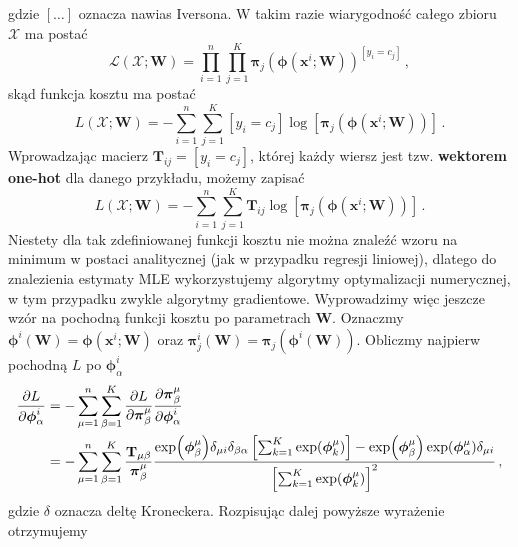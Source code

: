 \documentclass{myclass}
\numberwithin{equation}{subsection}
\begin{document}
gdzie \([\ldots]\) oznacza nawias Iversona. W takim razie wiarygodność całego zbioru \(\mathcal{X}\)
ma postać
\begin{equation}
    \mathcal{L}(\mathcal{X}; \mathbf{W}) = \prod_{i=1}^n \prod_{j=1}^K \boldsymbol{\pi}_j\left(\boldsymbol{\phi}(\mathbf{x}^i; \mathbf{W})\right)^{[y_i = c_j]}\,,
\end{equation}
skąd funkcja kosztu ma postać
\begin{equation}
    L(\mathcal{X}; \mathbf{W}) = - \sum_{i=1}^n \sum_{j=1}^K [y_i = c_j] \log \left[ \boldsymbol{\pi}_j\left(\boldsymbol{\phi}(\mathbf{x}^i; \mathbf{W})\right)\right]\,.
\end{equation}
Wprowadzając macierz \(\mathbf{T}_{ij} = [y_i = c_j]\), której każdy wiersz jest tzw.
\textbf{wektorem one-hot} dla danego przykładu, możemy zapisać
\begin{equation}\boxed{
    L(\mathcal{X}; \mathbf{W}) = - \sum_{i=1}^n \sum_{j=1}^K \mathbf{T}_{ij} \log \left[ \boldsymbol{\pi}_j\left(\boldsymbol{\phi}(\mathbf{x}^i; \mathbf{W})\right)\right]\,.
}\end{equation}
Niestety dla tak zdefiniowanej funkcji kosztu nie można znaleźć wzoru na minimum w postaci
analitycznej (jak w przypadku regresji liniowej), dlatego do znalezienia estymaty MLE wykorzystujemy
algorytmy optymalizacji numerycznej, w tym przypadku zwykle algorytmy gradientowe. Wyprowadzimy więc
jeszcze wzór na pochodną funkcji kosztu po parametrach \(\mathbf{W}\). Oznaczmy
\(\boldsymbol{\phi}^i(\mathbf{W}) = \boldsymbol{\phi}(\mathbf{x}^i; \mathbf{W})\) oraz
\(\boldsymbol{\pi}_j^i(\mathbf{W}) = \boldsymbol{\pi}_j(\boldsymbol{\phi}^i(\mathbf{W}))\). Obliczmy
najpierw pochodną \(L\) po \(\boldsymbol{\phi}^i_\alpha\)
\begin{equation}
    \begin{split}
        \pdv{L}{\boldsymbol{\phi}^i_\alpha} &= -\sum_{\mu=1}^n\sum_{\beta=1}^K \pdv{L}{\boldsymbol{\pi}_\beta^\mu}\pdv{\boldsymbol{\pi}_\beta^\mu}{\boldsymbol{\phi}^i_\alpha}\\
        &= -\sum_{\mu=1}^n\sum_{\beta=1}^K \frac{\mathbf{T}_{\mu\beta}}{\boldsymbol{\pi}_\beta^\mu} \frac{\exp(\boldsymbol{\phi}_\beta^\mu)\delta_{\mu i}\delta_{\beta \alpha} \left[\sum_{k=1}^K \exp(\boldsymbol{\phi}_k^\mu)\right] - \exp(\boldsymbol{\phi}_\beta^\mu) \exp(\boldsymbol{\phi}^\mu_\alpha) \delta_{\mu i}}{\left[\sum_{k=1}^K \exp(\boldsymbol{\phi}_k^\mu)\right]^2}\,,
    \end{split}
\end{equation}
gdzie \(\delta\) oznacza deltę Kroneckera. Rozpisując dalej powyższe wyrażenie otrzymujemy
\end{document}
